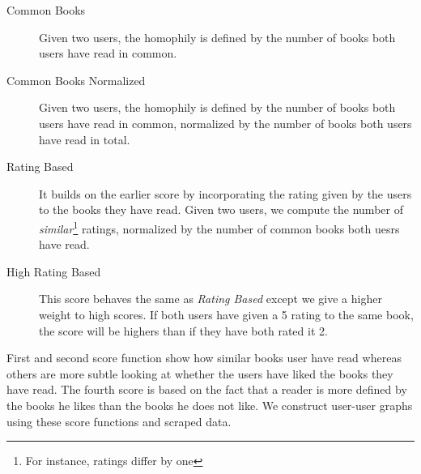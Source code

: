 \documentclass[11pt]{article}
\begin{document}
\begin{description}
	\item[Common Books] Given two users, the homophily is defined by the number of books both users have read in common.
    \item[Common Books Normalized] Given two users, the homophily is defined by the number of books both users have read in common, normalized by the number of books both users have read in total.
    \item[Rating Based] It builds on the earlier score by incorporating the rating given by the users to the books they have read. Given two users, we compute the number of {\it similar}\footnote{For instance, ratings differ by one} ratings, normalized by the number of common books both uesrs have read.
    \item[High Rating Based] This score behaves the same as \textit{Rating Based} except we give a higher weight to high scores.
    If both users have given a 5 rating to the same book, the score will be highers than if they have both rated it 2. 
\end{description}


First and second score function show how similar books user have read whereas others are more subtle looking at whether the users have liked the books they have read. The fourth score is based on the fact that a reader is more defined by the books he likes than the books he does not like. We construct user-user graphs using these score functions and scraped data.
\end{document}

